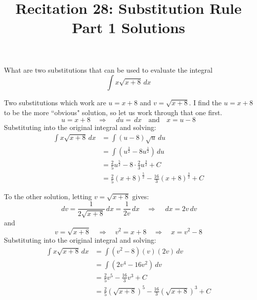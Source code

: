 \documentclass[nooutcomes]{ximera}
\title{Recitation 28: Substitution Rule Part 1 Solutions}
\renewcommand{\d}{\,d}
\renewenvironment{freeResponse}{
\ifhandout\setbox0\vbox\bgroup\else
\begin{trivlist}\item[\hskip \labelsep\bfseries Solution:\hspace{2ex}]
\fi}
{\ifhandout\egroup\else
\end{trivlist}
\fi}
\begin{document}
\begin{abstract}		\end{abstract}
\maketitle

\begin{problem}[warmup]
  What are two substitutions that can be used to evaluate the integral
  \begin{equation*}
    \int x \sqrt{x+8} \d x
  \end{equation*}
	
		\begin{freeResponse}
                  Two substitutions which work are $u=x+8$ and
                  $v=\sqrt{x+8}$.  I find the $u=x+8$ to be the more
                  ``obvious" solution, so let us work through that one
                  first.
                  \begin{equation*}
                    u=x+8 \quad \Longrightarrow \quad \d u = \d x \quad \text{and} \quad x = u-8
                  \end{equation*}
                  Substituting into the original integral and solving:
                  \begin{align*}
                    \int x \sqrt{x+8} \d x &= \int (u-8) \sqrt{u} \d u  \\
                                           &= \int (u^{\frac{3}{2}} - 8u^{\frac{1}{2}} ) \d u  \\
                                           &= \frac{2}{5} u^{\frac{5}{2}} - 8 \cdot \frac{2}{3} u^{\frac{3}{2}} + C  \\
                                           &= \frac{2}{5} (x+8)^{\frac{5}{2}} - \frac{16}{3} (x+8)^{\frac{3}{2}} + C
                  \end{align*}
		
                  To the other solution, letting $v=\sqrt{x+8}$ gives:
                  \begin{equation*}
                    \d v = \frac{1}{2 \sqrt{x+8}} \d x = \frac{1}{2v} \d x 	\quad	\Longrightarrow \quad \d x = 2v \d v
                  \end{equation*}
                  and
                  \begin{equation*}
                    v = \sqrt{x+8} \quad \Longrightarrow \quad v^2 = x+8 \quad \Longrightarrow \quad x= v^2-8
                  \end{equation*}
                  Substituting into the original integral and solving:
                  \begin{align*}
                    \int x \sqrt{x+8} \d x &= \int (v^2-8)(v)(2v)\d v  \\
                                           &= \int (2v^4 - 16v^2) \d v  \\
                                           &= \frac{2}{5} v^5 - \frac{16}{3} v^3 + C  \\
                                           &= \frac{2}{5} (\sqrt{x+8})^5 - \frac{16}{3} (\sqrt{x+8})^3 + C
                  \end{align*}
		

\end{freeResponse}
\end{problem}
\end{document}
